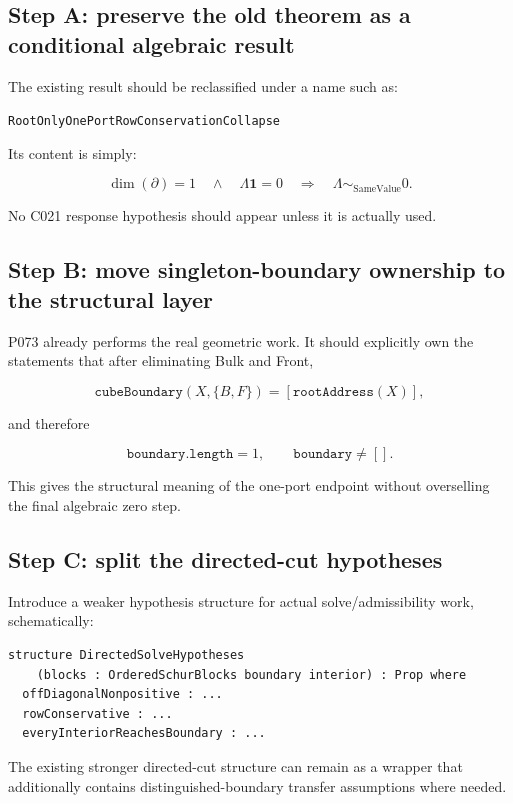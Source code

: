 \documentclass[11pt,a4paper]{article}
\begin{document}
\subsection{Step A: preserve the old theorem as a conditional algebraic result}

The existing result should be reclassified under a name such as:

\begin{center}
\texttt{RootOnlyOnePortRowConservationCollapse}
\end{center}

Its content is simply:

\[
\dim(\partial)=1
\quad\wedge\quad
\Lambda \mathbf{1}=0
\quad\Longrightarrow\quad
\Lambda \sim_{\mathrm{SameValue}} 0.
\]

No C021 response hypothesis should appear unless it is actually used.

\subsection{Step B: move singleton-boundary ownership to the structural layer}

P073 already performs the real geometric work. It should explicitly own the statements that after eliminating Bulk and Front,

\[
\texttt{cubeBoundary}(X,\{B,F\})=[\texttt{rootAddress}(X)],
\]

and therefore

\[
\texttt{boundary.length}=1,
\qquad
\texttt{boundary}\neq[].
\]

This gives the structural meaning of the one-port endpoint without overselling the final algebraic zero step.

\subsection{Step C: split the directed-cut hypotheses}

Introduce a weaker hypothesis structure for actual solve/admissibility work, schematically:

\begin{lstlisting}
structure DirectedSolveHypotheses
    (blocks : OrderedSchurBlocks boundary interior) : Prop where
  offDiagonalNonpositive : ...
  rowConservative : ...
  everyInteriorReachesBoundary : ...
\end{lstlisting}

The existing stronger directed-cut structure can remain as a wrapper that additionally contains distinguished-boundary transfer assumptions where needed.
\end{document}
